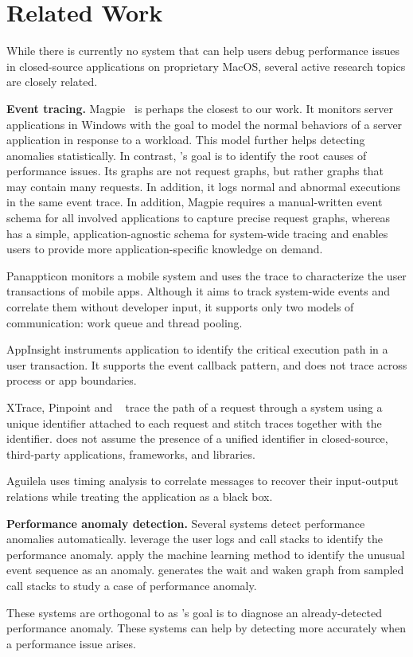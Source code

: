 \section{Related Work}
\label{sec:related-work}

While there is currently no system that can help users debug performance
issues in closed-source applications on proprietary MacOS, several active
research topics are closely related.

\textbf{Event tracing.}  Magpie~\cite{barham2004using} is perhaps the closest to
our work.  It monitors server applications in Windows with the goal to model
the normal behaviors of a server application in response to a workload.  This
model further helps detecting anomalies statistically.  In contrast, \xxx's
goal is to identify the root causes of performance issues.  Its graphs are not
request graphs, but rather graphs that may contain many requests.  In addition,
it logs normal and abnormal executions in the same event trace.  In addition,
Magpie requires a manual-written event schema for all involved applications to
capture precise request graphs, whereas \xxx has a simple, application-agnostic
schema for system-wide tracing and enables users to provide more
application-specific knowledge on demand.

Panappticon \cite{zhang2013panappticon} monitors a mobile system and uses the
trace to characterize the user transactions of mobile apps.  Although it
aims to track system-wide events and correlate them without developer
input, it supports only two models of communication: work queue and thread
pooling.

AppInsight \cite{ravindranath2012appinsight} instruments application to
identify the critical execution path in a user transaction.  It supports the
event callback pattern, and does not trace across process or app boundaries.

XTrace, Pinpoint and \etc ~\cite{fonseca2007x, chen2002pinpoint,
chow2014mystery} trace the path of a request through a system using a unique
identifier attached to each request and stitch traces together with the
identifier.  \xxx does not assume the presence of a unified identifier in
closed-source, third-party applications, frameworks, and libraries.

Aguilela \cite{aguilera2003performance} uses timing analysis to correlate
messages to recover their input-output relations while treating the application
as a black box.

\textbf{Performance anomaly detection.}  Several systems detect performance
anomalies automatically.  \cite{han2012performance, yuan2012conservative}
leverage the user logs and call stacks to identify the performance anomaly.
\cite{cohen2004correlating, saidi2008full, xu2009detecting, du2017deeplog} apply
the machine learning method to identify the unusual event sequence as an
anomaly.  \cite{yu2014comprehending} generates the wait and waken graph from
sampled call stacks to study a case of performance anomaly.

These systems are orthogonal to \xxx as \xxx's goal is to diagnose an
already-detected performance anomaly.  These systems can help \xxx by detecting
more accurately when a performance issue arises.

